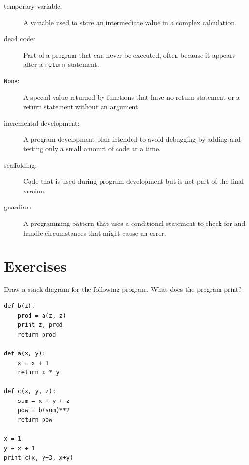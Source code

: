 \documentclass[10pt]{book}
\begin{document}
\begin{description}

\item[temporary variable:]  A variable used to store an intermediate value in
a complex calculation.

\item[dead code:]  Part of a program that can never be executed, often because
it appears after a {\tt return} statement.

\item[{\tt None}:]  A special value returned by functions that
have no return statement or a return statement without an argument.

\item[incremental development:]  A program development plan intended to
avoid debugging by adding and testing only
a small amount of code at a time.

\item[scaffolding:]  Code that is used during program development but is
not part of the final version.

\item[guardian:]  A programming pattern that uses a conditional
statement to check for and handle circumstances that
might cause an error.

\end{description}


\section{Exercises}

\begin{ex}

Draw a stack diagram for the following
program.  What does the program print?

\beforeverb
\begin{verbatim}
def b(z):
    prod = a(z, z)
    print z, prod
    return prod

def a(x, y):
    x = x + 1
    return x * y

def c(x, y, z):
    sum = x + y + z
    pow = b(sum)**2
    return pow

x = 1
y = x + 1
print c(x, y+3, x+y)
\end{verbatim}
\afterverb

\end{ex}
\end{document}
